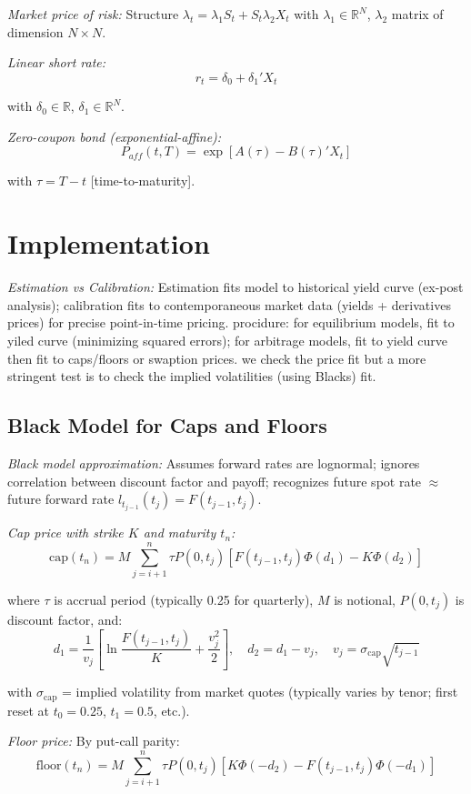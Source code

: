 \documentclass[12pt,a4paper]{article}
\begin{document}
\textit{Market price of risk:} Structure $\lambda_t = \lambda_1 S_t + S_t\lambda_2 X_t$ with $\lambda_1 \in \mathbb{R}^N$, $\lambda_2$ matrix of dimension $N \times N$.

\textit{Linear short rate:}
$$r_t = \delta_0 + \delta_1' X_t$$

with $\delta_0 \in \mathbb{R}$, $\delta_1 \in \mathbb{R}^N$.

\textit{Zero-coupon bond (exponential-affine):}
$$P_{aff}(t,T) = \exp[A(\tau) - B(\tau)' X_t]$$

with $\tau = T - t$ [time-to-maturity].
\section{Implementation}

\textit{Estimation vs Calibration:} Estimation fits model to historical yield curve (ex-post analysis); calibration fits to contemporaneous market data (yields + derivatives prices) for precise point-in-time pricing.
procidure: for equilibrium models, fit to yiled curve (minimizing squared errors); for arbitrage models, fit to yield curve then fit to caps/floors or swaption prices. we check the price fit but a more stringent test is to check the implied volatilities (using Blacks) fit.

\subsection{Black Model for Caps and Floors}

\textit{Black model approximation:} Assumes forward rates are lognormal; ignores correlation between discount factor and payoff; recognizes future spot rate $\approx$ future forward rate $l_{t_{j-1}}(t_j) = F(t_{j-1}, t_j)$.

\textit{Cap price with strike $K$ and maturity $t_n$:}
$$\text{cap}(t_n) = M \sum_{j=i+1}^n \tau P(0, t_j)\left[F(t_{j-1}, t_j)\Phi(d_1) - K\Phi(d_2)\right]$$

where $\tau$ is accrual period (typically 0.25 for quarterly), $M$ is notional, $P(0, t_j)$ is discount factor, and:
$$d_1 = \frac{1}{v_j}\left[\ln\frac{F(t_{j-1}, t_j)}{K} + \frac{v_j^2}{2}\right], \quad d_2 = d_1 - v_j, \quad v_j = \sigma_{\text{cap}}\sqrt{t_{j-1}}$$

with $\sigma_{\text{cap}}$ = implied volatility from market quotes (typically varies by tenor; first reset at $t_0 = 0.25$, $t_1 = 0.5$, etc.).

\textit{Floor price:} By put-call parity:
$$\text{floor}(t_n) = M \sum_{j=i+1}^n \tau P(0, t_j)\left[K\Phi(-d_2) - F(t_{j-1}, t_j)\Phi(-d_1)\right]$$
\end{document}
